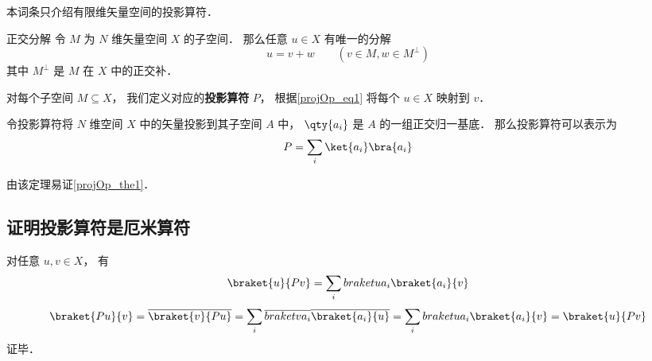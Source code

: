 

本词条只介绍有限维矢量空间的投影算符．

\begin{theorem}{正交分解}\label{projOp_the1}
令 $M$ 为 $N$ 维矢量空间 $X$ 的子空间． 那么任意 $u\in X$ 有唯一的分解
\begin{equation}\label{projOp_eq1}
u = v + w \qquad (v\in M, w\in M^\bot)
\end{equation}
其中 $M^\bot$ 是 $M$ 在 $X$ 中的正交补．
\end{theorem}

对每个子空间 $M\subseteq X$， 我们定义对应的\textbf{投影算符} $P$， 根据\autoref{projOp_eq1} 将每个 $u\in X$ 映射到 $v$．

\begin{theorem}{}
令投影算符将 $N$ 维空间 $X$ 中的矢量投影到其子空间 $A$ 中， $\qty{a_i}$ 是 $A$ 的一组正交归一基底． 那么投影算符可以表示为
\begin{equation}
P = \sum_i \ket{a_i}\bra{a_i}
\end{equation}
\end{theorem}
由该定理易证\autoref{projOp_the1}．

\subsection{证明投影算符是厄米算符}
对任意 $u, v\in X$， 有
\begin{equation}
\braket{u}{Pv} = \sum_i \\braket{u}{a_i}\braket{a_i}{v}
\end{equation}
\begin{equation}
\braket{Pu}{v} = \overline {\braket{v}{Pu}} = \sum_i \overline{\\braket{v}{a_i}}\overline{\braket{a_i}{u}} = \sum_i \\braket{u}{a_i}\braket{a_i}{v} = \braket{u}{Pv}
\end{equation}
证毕．
